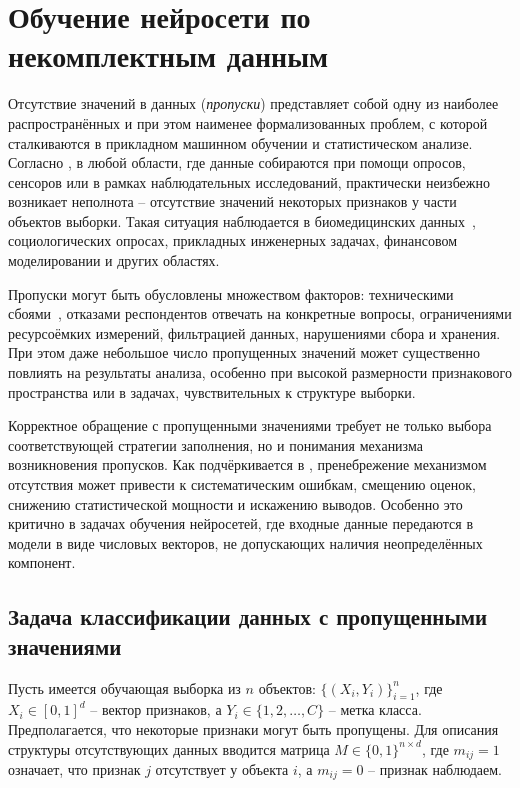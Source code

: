 \section{Обучение нейросети по некомплектным данным}

Отсутствие значений в данных (\emph{пропуски}) представляет собой одну из наиболее распространённых и при этом наименее формализованных проблем, с которой сталкиваются в прикладном машинном обучении и статистическом анализе. Согласно \cite{little1995statistical}, в любой области, где данные собираются при помощи опросов, сенсоров или в рамках наблюдательных исследований, практически неизбежно возникает неполнота -- отсутствие значений некоторых признаков у части объектов выборки. Такая ситуация наблюдается в биомедицинских данных~\cite{cismondi2013missing}, социологических опросах, прикладных инженерных задачах, финансовом моделировании и других областях.

Пропуски могут быть обусловлены множеством факторов: техническими сбоями~\cite{du2020missing}, отказами респондентов отвечать на конкретные вопросы, ограничениями ресурсоёмких измерений, фильтрацией данных, нарушениями сбора и хранения. При этом даже небольшое число пропущенных значений может существенно повлиять на результаты анализа, особенно при высокой размерности признакового пространства или в задачах, чувствительных к структуре выборки.

Корректное обращение с пропущенными значениями требует не только выбора соответствующей стратегии заполнения, но и понимания механизма возникновения пропусков. Как подчёркивается в \cite{little1995statistical, schafer1997analysis}, пренебрежение механизмом отсутствия может привести к систематическим ошибкам, смещению оценок, снижению статистической мощности и искажению выводов. Особенно это критично в задачах обучения нейросетей, где входные данные передаются в модели в виде числовых векторов, не допускающих наличия неопределённых компонент.

\subsection{Задача классификации данных с пропущенными значениями}

Пусть имеется обучающая выборка из \(n\) объектов: \( \{(X_i, Y_i)\}_{i=1}^n \), где \(X_i \in [0, 1]^d\) -- вектор признаков, а \(Y_i \in \{1, 2, \dots, C\}\) -- метка класса. Предполагается, что некоторые признаки могут быть пропущены. Для описания структуры отсутствующих данных вводится матрица \(M \in \{0, 1\}^{n \times d}\), где \(m_{ij} = 1\) означает, что признак \(j\) отсутствует у объекта \(i\), а \(m_{ij} = 0\) -- признак наблюдаем.


